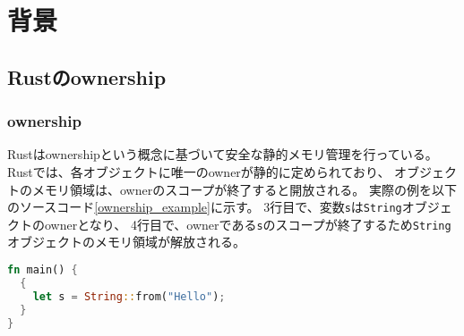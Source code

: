 \documentclass{sumiilab-paper}
\theoremstyle{mystyle}
\numberwithin{definition}{chapter} %
\begin{document}

\chapter{背景}

\section{Rustのownership}

\subsection{ownership}
Rustはownershipという概念に基づいて安全な静的メモリ管理を行っている。
Rustでは、各オブジェクトに唯一のownerが静的に定められており、
オブジェクトのメモリ領域は、ownerのスコープが終了すると開放される。
実際の例を以下のソースコード\ref{ownership_example}に示す。
3行目で、変数\texttt{s}は\texttt{String}オブジェクトのownerとなり、
4行目で、ownerである\texttt{s}のスコープが終了するため\texttt{String}オブジェクトのメモリ領域が解放される。

\begin{lstlisting}[language=Rust,caption=ownershipによるメモリ管理,label=ownership_example, captionpos=b]
fn main() {
  {
    let s = String::from("Hello");
  }
}
\end{lstlisting}
\end{document}
